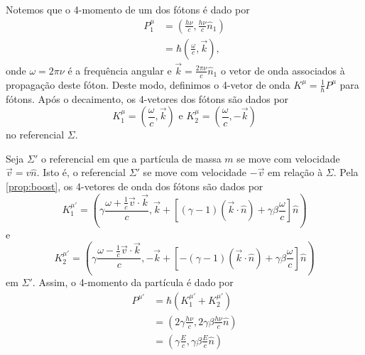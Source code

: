 \documentclass[12pt,a4paper]{article}
\numberwithin{equation}{section}
\begin{document}
Notemos que  o 4-momento de um dos fótons é dado por
\begin{align*}
    P_1^\mu &= \left(\frac{h \nu}{c}, \frac{h\nu}{c}\hat{n}_1\right)\\
            &= \hbar \left(\frac{\omega}{c}, \vec{k}\right),
\end{align*}
onde \(\omega = 2\pi \nu\) é a frequência angular e \(\vec{k} = \frac{2\pi \nu}{c}\hat{n}_1\) o vetor de onda associados à propagação deste fóton. Deste modo, definimos o 4-vetor de onda \(K^\mu = \frac{1}{\hbar} P^\mu\) para fótons. Após o decaimento, os 4-vetores dos fótons são dados por
\begin{equation*}
    K_1^\mu = \left(\frac{\omega}{c}, \vec{k}\right) \text{ e }K_2^\mu = \left(\frac{\omega}{c}, -\vec{k}\right)
\end{equation*}
no referencial \(\Sigma\).

Seja \(\Sigma'\) o referencial em que a partícula de massa \(m\) se move com velocidade \(\vec{v} = v \hat{n}\). Isto é, o referencial \(\Sigma'\) se move com velocidade \(-\vec{v}\) em relação à \(\Sigma\). Pela \cref{prop:boost}, os 4-vetores de onda dos fótons são dados por
\begin{equation*}
    K_1^{\mu'} = \left(\gamma\frac{\omega + \frac{1}{c} \vec{v} \cdot \vec{k}}{c}, \vec{k} + \left[(\gamma - 1)(\vec{k} \cdot \hat{n}) + \gamma \beta \frac{\omega}{c} \right] \hat{n}\right)
\end{equation*}
e
\begin{equation*}
    K_2^{\mu'} = \left(\gamma\frac{\omega - \frac{1}{c} \vec{v} \cdot \vec{k}}{c}, -\vec{k} + \left[-(\gamma - 1)(\vec{k} \cdot \hat{n}) + \gamma \beta \frac{\omega}{c} \right] \hat{n}\right)
\end{equation*}
em \(\Sigma'\). Assim, o 4-momento da partícula é dado por
\begin{align*}
    P^{\mu'} &= \hbar \left(K_1^{\mu'} + K_2^{\mu'}\right)\\
    &= \left(2\gamma\frac{h\nu}{c}, 2\gamma \beta \frac{h\nu}{c}\hat{n}\right)\\
    &= \left(\gamma \frac{E}{c}, \gamma \beta \frac{E}{c} \hat{n}\right)
\end{align*}
\end{document}
